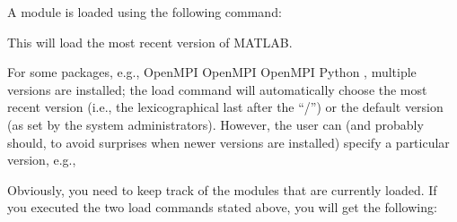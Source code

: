A module is loaded using the following command:

\ifantwerpen
\begin{prompt}
\end{prompt}
\fi
\ifbrussel
\begin{prompt}
\end{prompt}
\fi
\ifgent
\begin{prompt}
\end{prompt}
\fi
\ifleuven
\begin{prompt}
\end{prompt}
\fi

This will load the most recent version of MATLAB.

For some packages, e.g.,
\ifantwerpen
OpenMPI
\fi
\ifbrussel
OpenMPI
\fi
\ifgent
OpenMPI
\fi
\ifleuven
Python
\fi
, multiple versions are installed; the load
command will automatically choose the most recent version (i.e., the
lexicographical last after the ``/'') or the default version (as set by the
system administrators). However, the user can (and probably should, to avoid
surprises when newer versions are installed) specify a particular version,
e.g.,

\ifantwerpen
\begin{prompt}
\end{prompt}
\fi
\ifbrussel
\begin{prompt}
\end{prompt}
\fi
\ifgent
\begin{prompt}
\end{prompt}
\fi
\ifleuven
\begin{prompt}
\end{prompt}
\fi

Obviously, you need to keep track of the modules that are currently
loaded. If you executed the two load commands stated above, you will get the
following:

